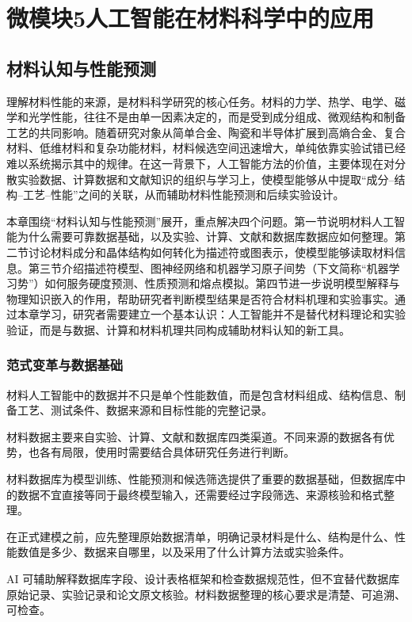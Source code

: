 % 
\part*{微模块5\quad 人工智能在材料科学中的应用}

\chapter{材料认知与性能预测}
\label{chap:materials-cognition-prediction}


理解材料性能的来源，是材料科学研究的核心任务。材料的力学、热学、电学、磁学和光学性能，往往不是由单一因素决定的，而是受到成分组成、微观结构和制备工艺的共同影响。随着研究对象从简单合金、陶瓷和半导体扩展到高熵合金、复合材料、低维材料和复杂功能材料，材料候选空间迅速增大，单纯依靠实验试错已经难以系统揭示其中的规律。在这一背景下，人工智能方法的价值，主要体现在对分散实验数据、计算数据和文献知识的组织与学习上，使模型能够从中提取“成分--结构--工艺--性能”之间的关联，从而辅助材料性能预测和后续实验设计。

本章围绕“材料认知与性能预测”展开，重点解决四个问题。第一节说明材料人工智能为什么需要可靠数据基础，以及实验、计算、文献和数据库数据应如何整理。第二节讨论材料成分和晶体结构如何转化为描述符或图表示，使模型能够读取材料信息。第三节介绍描述符模型、图神经网络和机器学习原子间势（下文简称“机器学习势”）如何服务硬度预测、性质预测和熔点模拟。第四节进一步说明模型解释与物理知识嵌入的作用，帮助研究者判断模型结果是否符合材料机理和实验事实。通过本章学习，研究者需要建立一个基本认识：人工智能并不是替代材料理论和实验验证，而是与数据、计算和材料机理共同构成辅助材料认知的新工具。




\clearpage
\section{范式变革与数据基础}


\begin{sectionkeypoints}
\item 材料人工智能中的数据并不只是单个性能数值，而是包含材料组成、结构信息、制备工艺、测试条件、数据来源和目标性能的完整记录。
\item 材料数据主要来自实验、计算、文献和数据库四类渠道。不同来源的数据各有优势，也各有局限，使用时需要结合具体研究任务进行判断。
\item 材料数据库为模型训练、性能预测和候选筛选提供了重要的数据基础，但数据库中的数据不宜直接等同于最终模型输入，还需要经过字段筛选、来源核验和格式整理。
\item 在正式建模之前，应先整理原始数据清单，明确记录材料是什么、结构是什么、性能数值是多少、数据来自哪里，以及采用了什么计算方法或实验条件。
\item AI 可辅助解释数据库字段、设计表格框架和检查数据规范性，但不宜替代数据库原始记录、实验记录和论文原文核验。材料数据整理的核心要求是清楚、可追溯、可检查。
\end{sectionkeypoints}

